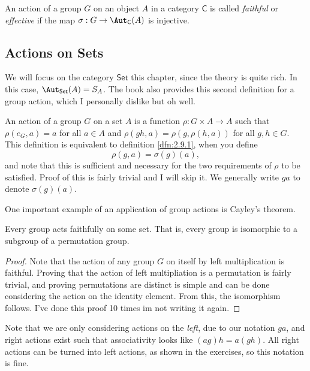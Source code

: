 \begin{definition}\label{dfn:2.8.2}
	An action of a group $G$ on an object $A$ in a category $\mathsf{C}$ is called \emph{faithful} or \emph{effective} if the map $\sigma : G \to \Aut_{\mathsf{C}}( A ) $ is injective.
\end{definition}
\subsection{Actions on Sets}
We will focus on the category $\mathsf{Set}$ this chapter, since the theory is quite rich. In this case, $\Aut_{\mathsf{Set}}( A ) =S_A$. The book also provides this second definition for a group action, which I personally dislike but oh well.

An action of a group $G$ on a set $A$ is a function $\rho : G\times A \to A$ such that $\rho (e_G,a)=a$ for all $a\in A$ and $\rho (gh,a)=\rho (g,\rho (h,a))$ for all $g,h\in G$. This definition is equivalent to definition \ref{dfn:2.9.1}, when you define
\[
	\rho (g,a)=\sigma (g)(a)
,\]
and note that this is sufficient and necessary for the two requirements of $\rho $ to be satisfied. Proof of this is fairly trivial and I will skip it. We generally write $ga$ to denote $\sigma (g)(a)$.

One important example of an application of group actions is Cayley's theorem.
\begin{theorem}[Cayley]\label{thm:2.9.1}
	Every group acts faithfully on some set. That is, every group is isomorphic to a subgroup of a permutation group.
\end{theorem}
\begin{proof}
	Note that the action of any group $G$ on itself by left multiplication is faithful. Proving that the action of left multipliation is a permutation is fairly trivial, and proving permutations are distinct is simple and can be done considering the action on the identity element. From this, the isomorphism follows. I've done this proof 10 times im not writing it again.
\end{proof}

Note that we are only considering actions on the \emph{left}, due to our notation $ga$, and right actions exist such that associativity looks like $(ag)h=a(gh)$. All right actions can be turned into left actions, as shown in the exercises, so this notation is fine.

